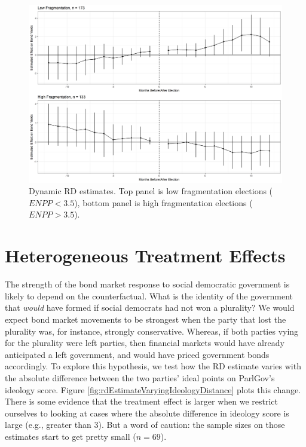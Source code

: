 \documentclass[12pt]{article}
\begin{document}
\begin{figure} [h]
	\centering
	\includegraphics[width=\linewidth]{Figures/dynamicRD}
	\caption{Dynamic RD estimates. Top panel is low fragmentation elections ($ENPP < 3.5$), bottom panel is high fragmentation elections ($ENPP > 3.5$).}
	\label{fig:dynamicRD}
\end{figure}

\section{Heterogeneous Treatment Effects}

The strength of the bond market response to social democratic government is likely to depend on the counterfactual. What is the identity of the government that \textit{would} have formed if social democrats had not won a plurality? We would expect bond market movements to be strongest when the party that lost the plurality was, for instance, strongly conservative. Whereas, if both parties vying for the plurality were left parties, then financial markets would have already anticipated a left government, and would have priced government bonds accordingly. To explore this hypothesis, we test how the RD estimate varies with the absolute difference between the two parties' ideal points on ParlGov's ideology score. Figure \ref{fig:rdEstimateVaryingIdeologyDistance} plots this change. There is some evidence that the treatment effect is larger when we restrict ourselves to looking at cases where the absolute difference in ideology score is large (e.g., greater than 3). But a word of caution: the sample sizes on those estimates start to get pretty small ($n = 69$).
\end{document}
